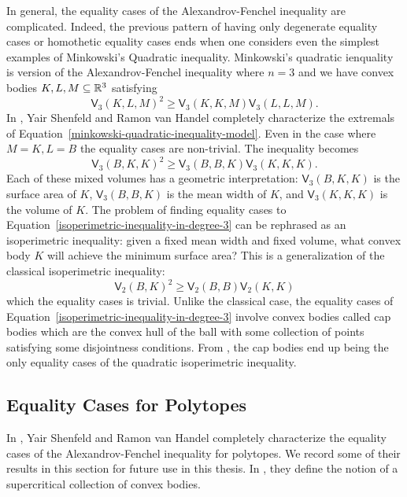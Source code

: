 \documentclass{puthesis-UG}
\begin{document}
In general, the equality cases of the Alexandrov-Fenchel inequality are complicated. Indeed, the previous pattern of having only degenerate equality cases or homothetic equality cases ends when one considers even the simplest examples of Minkowski's Quadratic inequality. Minkowski's quadratic ienquality is version of the Alexandrov-Fenchel inequality where $n = 3$ and we have convex bodies $K, L, M \subseteq \mathbb{R}^3$ satisfying 
\begin{equation} \label{minkowski-quadratic-inequality-model}
	\mathsf{V}_3(K, L, M)^2 \geq \mathsf{V}_3 (K, K, M) \mathsf{V}_3 (L, L, M). 
\end{equation}
In \cite{minkowski-quadratic-inequality}, Yair Shenfeld and Ramon van Handel completely characterize the extremals of Equation~\ref{minkowski-quadratic-inequality-model}. Even in the case where $M = K, L = B$ the equality cases are non-trivial. The inequality becomes
\begin{equation} \label{isoperimetric-inequality-in-degree-3}
	\mathsf{V}_3 (B, K, K)^2 \geq \mathsf{V}_3(B, B, K) \mathsf{V}_3(K, K, K). 
\end{equation}
Each of these mixed volumes has a geometric interpretation: $\mathsf{V}_3 (B, K, K)$ is the surface area of $K$, $\mathsf{V}_3 (B, B, K)$ is the mean width of $K$, and $\mathsf{V}_3 (K, K, K)$ is the volume of $K$. The problem of finding equality cases to Equation~\ref{isoperimetric-inequality-in-degree-3} can be rephrased as an isoperimetric inequality: given a fixed mean width and fixed volume, what convex body $K$ will achieve the minimum surface area? This is a generalization of the classical isoperimetric inequality:
\[
	\mathsf{V}_2(B, K)^2 \geq \mathsf{V}_2(B, B) \mathsf{V}_2(K, K)
\]
which the equality cases is trivial. Unlike the classical case, the equality cases of Equation~\ref{isoperimetric-inequality-in-degree-3} involve convex bodies called cap bodies which are the convex hull of the ball with some collection of points satisfying some disjointness conditions. From \cite{Bol}, the cap bodies end up being the only equality cases of the quadratic isoperimetric inequality. 

\subsection{Equality Cases for Polytopes}

In \cite{minkowski-quadratic-inequality}, Yair Shenfeld and Ramon van Handel completely characterize the equality cases of the Alexandrov-Fenchel inequality for polytopes. We record some of their results in this section for future use in this thesis. In \cite{shenfeld2022extremals}, they define the notion of a supercritical collection of convex bodies. 
\end{document}
